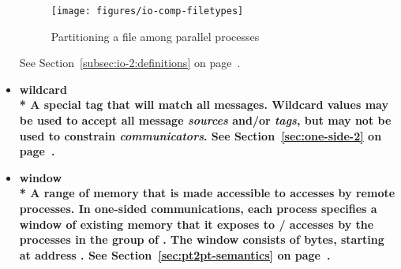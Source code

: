 \begin{itemize}
\begin{figure}[htpb]
  \centerline{\texttt{[image: figures/io-comp-filetypes]}}
  \caption{Partitioning a file among parallel processes}
  \label{fig:gloss-io-comp-filetypes}
\end{figure}
See Section~\ref{subsec:io-2:definitions} on page~\pageref{subsec:io-2:definitions}.

\label{glossary:wildcard}
\item \bf{ wildcard} \\*
A special tag that will match all messages. Wildcard values may be used 
to accept all message \emph{sources} and/or \emph{tags}, but may not be used to 
constrain \emph{communicators}.
See Section~\ref{sec:one-side-2} on page~\pageref{sec:one-side-2}.

\label{glossary:window}
\item \bf{ window} \\*
A range of memory that is made accessible to accesses by remote 
processes. In one-sided communications, each process specifies
a window of existing memory that it exposes to \RMA/ accesses by the
processes in the group of  .
The window consists of  bytes,
starting at address .
See Section~\ref{sec:pt2pt-semantics} on page~\pageref{sec:pt2pt-semantics}.


\end{itemize}